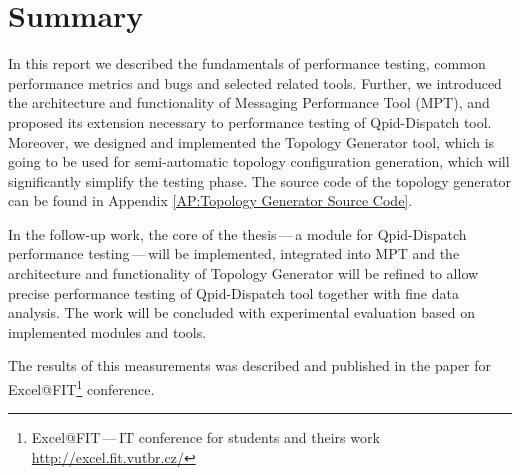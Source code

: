 
\chapter{Summary}
\label{Summary}
In this report we described the fundamentals of performance testing, common performance metrics and bugs and selected related tools. Further, we introduced the architecture and functionality of Messaging Performance Tool (MPT), and proposed its extension necessary to performance testing of Qpid-Dispatch tool. Moreover, we designed and implemented the Topology Generator tool, which is going to be used for semi-automatic topology configuration generation, which will significantly simplify the testing phase. The source code of the topology generator can be found in Appendix \ref{AP:Topology Generator Source Code}.

In the follow-up work, the core of the thesis\,---\,a module for Qpid-Dispatch performance testing\,---\,will be implemented, integrated into MPT and the architecture and functionality of Topology Generator will be refined to allow precise performance testing of Qpid-Dispatch tool together with fine data analysis. The work will be concluded with experimental evaluation based on implemented modules and tools.

The results of this measurements was described and published in the paper for Excel@FIT\footnote{Excel@FIT\,---\,IT conference for students and theirs work \url{http://excel.fit.vutbr.cz/}} conference.



